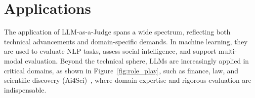 \documentclass[acmsmall,screen]{acmart}
\begin{document}






% 

\section{Applications}\label{sec:applications}

The application of LLM-as-a-Judge spans a wide spectrum, reflecting both technical advancements and domain-specific demands. In machine learning, they are used to evaluate NLP tasks, assess social intelligence, and support multi-modal evaluation. Beyond the technical sphere, LLMs are increasingly applied in critical domains, as shown in Figure~\ref{fig:role_play}, such as finance, law, and scientific discovery (Ai4Sci)~\cite{inno_aigeo_zhao2024artificial}, where domain expertise and rigorous evaluation are indispensable. 
\end{document}
